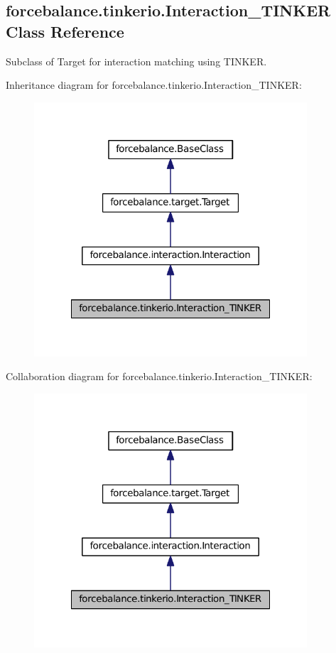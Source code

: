 \hypertarget{classforcebalance_1_1tinkerio_1_1Interaction__TINKER}{\subsection{forcebalance.\-tinkerio.\-Interaction\-\_\-\-T\-I\-N\-K\-E\-R \-Class \-Reference}
\label{classforcebalance_1_1tinkerio_1_1Interaction__TINKER}
}


\-Subclass of \-Target for interaction matching using \-T\-I\-N\-K\-E\-R.  




\-Inheritance diagram for forcebalance.\-tinkerio.\-Interaction\-\_\-\-T\-I\-N\-K\-E\-R\-:\nopagebreak
\begin{figure}[H]
\begin{center}
\leavevmode
\includegraphics[width=288pt]{classforcebalance_1_1tinkerio_1_1Interaction__TINKER__inherit__graph}
\end{center}
\end{figure}


\-Collaboration diagram for forcebalance.\-tinkerio.\-Interaction\-\_\-\-T\-I\-N\-K\-E\-R\-:\nopagebreak
\begin{figure}[H]
\begin{center}
\leavevmode
\includegraphics[width=288pt]{classforcebalance_1_1tinkerio_1_1Interaction__TINKER__coll__graph}
\end{center}
\end{figure}
